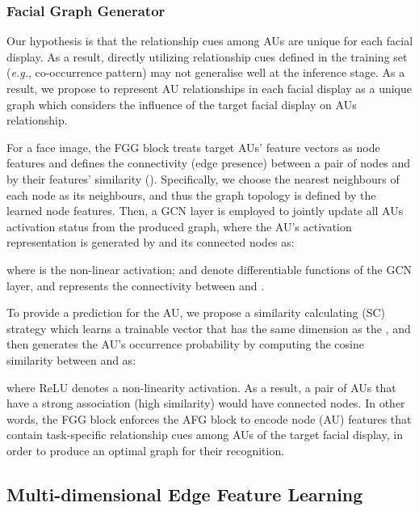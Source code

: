 \documentclass{article}
\begin{document}
\subsubsection{Facial Graph Generator}  
\label{subsec: FGG}


\noindent Our hypothesis is that the relationship cues among AUs are unique for each facial display. As a result, directly utilizing relationship cues defined in the training set (\emph{e.g.}, co-occurrence pattern) may not generalise well at the inference stage. As a result, we propose to represent AU relationships in each facial display as a unique graph which considers the influence of the target facial display on AUs relationship. 


For a face image, the FGG block treats  target AUs' feature vectors  as  node features and defines the connectivity (edge presence) between a pair of nodes  and  by their features' similarity (). Specifically, we choose the  nearest neighbours of each node as its neighbours, and thus the graph topology is defined by the learned node features. Then, a GCN layer is employed to jointly update all AUs activation status from the produced graph, where the  AU's activation representation  is generated by  and its connected nodes as:
 

where  is the non-linear activation;  and  denote differentiable functions of the GCN layer, and  represents the connectivity between  and . 

To provide a prediction for the  AU, we propose a similarity calculating (SC) strategy which learns a trainable vector  that has the same dimension as the , and then generates the  AU's occurrence probability by computing the cosine similarity between  and  as:

where ReLU denotes a non-linearity activation. As a result, a pair of AUs that have a strong association (high similarity) would have connected nodes. In other words, the FGG block enforces the AFG block to encode node (AU) features that contain task-specific relationship cues among AUs of the target facial display, in order to produce an optimal graph for their recognition. 





\subsection{Multi-dimensional Edge Feature Learning}
\label{subsec: multi-dimensional_edge_features}
\end{document}
